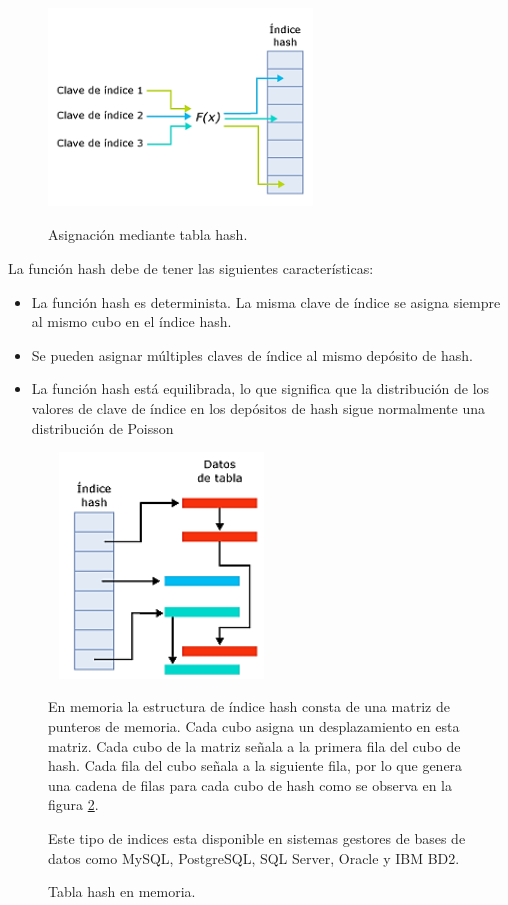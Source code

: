 \documentclass[12pt, titlepage]{article}
\begin{document}
	\begin{figure}[H]
		\begin{center}
			\includegraphics[width=7cm, height=6cm]{img/hash.png}
			\caption{Asignación mediante tabla hash.}
			\label{fig:hash}
		\end{center}
	\end{figure}
La función hash debe de tener las siguientes características:
\begin{itemize}
	\item La función hash es determinista. La misma clave de índice se asigna siempre al mismo cubo en el índice hash.
	\item Se pueden asignar múltiples claves de índice al mismo depósito de hash.
	\item La función hash está equilibrada, lo que significa que la distribución de los valores de clave de índice en los depósitos de hash sigue normalmente una distribución de Poisson
\end{itemize}
\begin{figure}[H]
	\begin{center}
		\includegraphics[width=6cm, height=6cm]{img/hash2.png}
		\caption{Tabla hash en memoria.}
		\label{fig:hash2}
	\end{center}
En memoria la estructura de índice hash consta de una matriz de punteros de memoria. Cada cubo asigna un desplazamiento en esta matriz. Cada cubo de la matriz señala a la primera fila del cubo de hash. Cada fila del cubo señala a la siguiente fila, por lo que genera una cadena de filas para cada cubo de hash como se observa en la figura \ref{fig:hash2}.

Este tipo de indices esta disponible en sistemas gestores de bases de datos como MySQL, PostgreSQL, SQL Server, Oracle y IBM BD2.
\end{figure}
\end{document}
